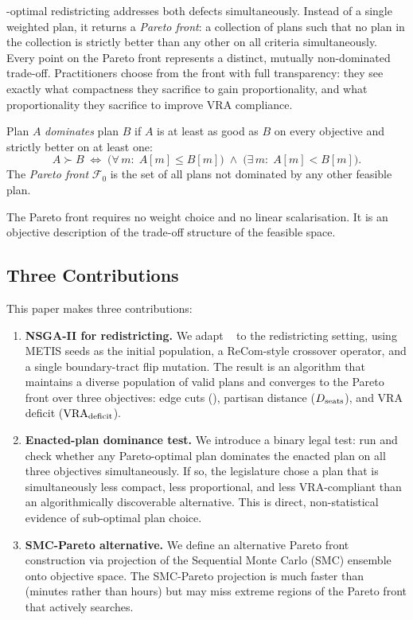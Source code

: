 \pareto{}-optimal redistricting addresses both defects simultaneously.
Instead of a single weighted plan, it returns a \emph{Pareto front}: a
collection of plans such that no plan in the collection is strictly better
than any other on all criteria simultaneously.
Every point on the Pareto front represents a distinct, mutually non-dominated
trade-off.
Practitioners choose from the front with full transparency: they see exactly
what compactness they sacrifice to gain proportionality, and what proportionality
they sacrifice to improve VRA compliance.

\begin{definition}
\label{def:dominance}
Plan $A$ \emph{dominates} plan $B$ if $A$ is at least as good as $B$ on every
objective and strictly better on at least one:
\[
  A \succ B \;\iff\;
  \bigl(\forall\, m:\; A[m] \leq B[m]\bigr)
  \;\wedge\;
  \bigl(\exists\, m:\; A[m] < B[m]\bigr).
\]
The \emph{Pareto front} $\mathcal{F}_0$ is the set of all plans not dominated
by any other feasible plan.
\end{definition}

The Pareto front requires no weight choice and no linear scalarisation.
It is an objective description of the trade-off structure of the feasible space.

\subsection{Three Contributions}

This paper makes three contributions:

\begin{enumerate}
\item \textbf{NSGA-II for redistricting.}
  We adapt \nsga{}~\citep{deb2002} to the redistricting setting, using METIS
  seeds as the initial population, a ReCom-style crossover operator, and a
  single boundary-tract flip mutation.
  The result is an algorithm that maintains a diverse population of valid plans
  and converges to the Pareto front over three objectives: edge cuts (\EC),
  partisan distance ($D_{\mathrm{seats}}$), and VRA deficit ($\mathrm{VRA}_{\mathrm{deficit}}$).

\item \textbf{Enacted-plan dominance test.}
  We introduce a binary legal test: run \nsga{} and check whether any
  Pareto-optimal plan dominates the enacted plan on all three objectives
  simultaneously.
  If so, the legislature chose a plan that is simultaneously less compact,
  less proportional, and less VRA-compliant than an algorithmically discoverable
  alternative.
  This is direct, non-statistical evidence of sub-optimal plan choice.

\item \textbf{SMC-Pareto alternative.}
  We define an alternative Pareto front construction via projection of the
  Sequential Monte Carlo (SMC) ensemble~\citep{dellaLibera2026smc} onto
  objective space.
  The SMC-Pareto projection is much faster than \nsga{} (minutes rather than
  hours) but may miss extreme regions of the Pareto front that \nsga{} actively
  searches.
\end{enumerate}

